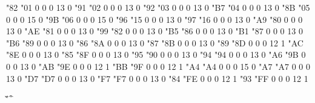 \setcharcode  "82  "01    0    0     0  13  0  \expandto {\clq}
\setcharcode  "91  "02    0    0     0  13  0  \expandto {\crq}
\setcharcode  "92  "03    0    0     0  13  0  
\setcharcode  "B7  "04    0    0     0  13  0  \expandto {$\cdot$}
\setcharcode  "8B  "05    0    0     0  15  0  %
\setcharcode  "9B  "06    0    0     0  15  0  %
\setcharcode  "96  "15    0    0     0  13  0  \expandto {--}
\setcharcode  "97  "16    0    0     0  13  0  \expandto {---}
\setcharcode  "A9  "80    0    0     0  13  0  \expandto {\copyright}
\setcharcode  "AE  "81    0    0     0  13  0  \expandto {\registered}
\setcharcode  "99  "82    0    0     0  13  0  \expandto {\trademark}
\setcharcode  "B5  "86    0    0     0  13  0  \expandto {$\mu$}
\setcharcode  "B1  "87    0    0     0  13  0  \expandto {$\pm$}
\setcharcode  "B6  "89    0    0     0  13  0  \expandto {\P}
\setcharcode  "86  "8A    0    0     0  13  0  \expandto {\dag}
\setcharcode  "87  "8B    0    0     0  13  0  \expandto {\ddag}
\setcharcode  "89  "8D    0    0     0  12  1  \texmacro \promile
\setcharcode  "AC  "8E    0    0     0  13  0  \expandto {$\neg$}
\setcharcode  "85  "8F    0    0     0  13  0  \expandto {\dots}
\setcharcode  "95  "90    0    0     0  13  0  \expandto {$\bullet$}
\setcharcode  "94  "94    0    0     0  13  0  
\setcharcode  "A6  "9B    0    0     0  13  0  \expandto {\pipe}
\setcharcode  "AB  "9E    0    0     0  12  1  \texmacro \flqq
\setcharcode  "BB  "9F    0    0     0  12  1  \texmacro \frqq
\setcharcode  "A4  "A4    0    0     0  15  0 %
\setcharcode  "A7  "A7    0    0     0  13  0  \expandto {\S}
\setcharcode  "D7  "D7    0    0     0  13  0  \expandto {$\times$}
\setcharcode  "F7  "F7    0    0     0  13  0  \expandto {$\div$}
\setcharcode  "84  "FE    0    0     0  12  1  \texmacro \clqq
\setcharcode  "93  "FF    0    0     0  12  1  \texmacro \crqq

\redefaccent \'
\redefaccent \v
\redefaccent \"
\redefaccent \^
\redefaccent \r

